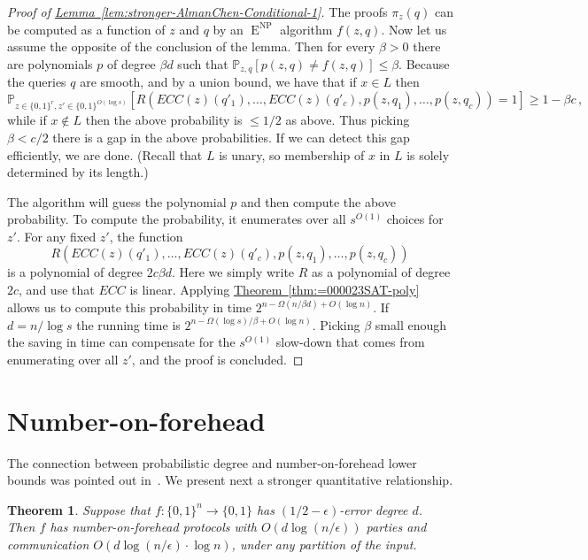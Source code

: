 \documentclass[11pt]{article}
\newcommand{\expref}[2]{\texorpdfstring{\hyperref[#2]{#1~\ref{#2}}}{#1~\ref{#2}}}
\newtheorem{thm}[theorem]{Theorem}
\DeclareMathOperator{\NP}{\mathrm{NP}}  %
\DeclareMathOperator{\EEE}{\mathrm{E}}  %
\newcommand{\zo}{\{0, 1\}}
\renewcommand{\P}{\mathbb{P}}
\newcommand{\e}{\epsilon}
\begin{document}
\begin{proof}[Proof of \expref{Lemma}{lem:stronger-AlmanChen-Conditional-1}]
The proofs $\pi_{z}(q)$ can be computed as a function of $z$ and
$q$ by an $\EEE^{\NP}$ algorithm $f(z,q)$. Now let us assume the opposite
of the conclusion of the lemma. Then for every $\beta>0$ there are
polynomials $p$ of degree $\beta d$ such that $\P_{z,q}[p(z,q)\ne f(z,q)]\le\beta$.
Because the queries $q$ are smooth, and by a union bound, we have
that if $x\in L$ then
\[
\P_{z\in\zo^{r},z'\in\zo^{O(\log s)}}[R(ECC(z)(q'_{1}),\ldots,ECC(z)(q'_{c}),p(z,q_{1}),\ldots,p(z,q_{c}))=1]\ge1-\beta c\,,
\]
while if $x\not\in L$ then the above probability is $\le1/2$ as
above. Thus picking $\beta<c/2$ there is a gap in the above probabilities.
If we can detect this gap efficiently, we are done. (Recall that $L$
is unary, so membership of $x$ in $L$ is solely determined by its
length.)

The algorithm will guess the polynomial $p$ and then compute the
above probability. To compute the probability, it enumerates over
all $s^{O(1)}$ choices for $z'$. For any fixed $z'$, the function
\[
R(ECC(z)(q'_{1}),\ldots,ECC(z)(q'_{c}),p(z,q_{1}),\ldots,p(z,q_{c}))
\]
is a polynomial of degree $2c\beta d$. Here we simply write $R$
as a polynomial of degree $2c$, and use that $ECC$ is linear. Applying
\expref{Theorem}{thm:=000023SAT-poly} allows us to compute this probability
in time $2^{n-\Omega(n/\beta d)+O(\log n)}$. If $d=n/\log s$ the
running time is $2^{n-\Omega(\log s)/\beta+O(\log n)}$. Picking $\beta$
small enough the saving in time can compensate for the $s^{O(1)}$
slow-down that comes from enumerating over all $z'$, and the proof
is concluded.
\end{proof}


\section{Number-on-forehead \label{sec:Number-on-forehead}}

The connection between probabilistic degree and number-on-forehead
lower bounds was pointed out in~\cite{Viola-map}. We present next
a stronger quantitative relationship.
\begin{thm}
\label{thm:NOF-connection}Suppose that $f:\zo^{n}\to\zo$ has $(1/2-\e)$-error
degree $d$. Then $f$ has number-on-forehead protocols with $O(d\log(n/\e))$
parties and communication $O(d\log(n/\e)\cdot\log n)$, under any
partition of the input.
\end{thm}
\end{document}
